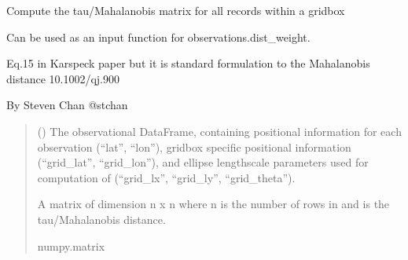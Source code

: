 \documentclass[letterpaper,10pt,english]{sphinxmanual}
\begin{document}
\begin{fulllineitems}
\label{\detokenize{misc:glomar_gridding.distances.tau_dist_from_frame}}
\pysigstartsignatures
\pysiglinewithargsret
{}
{}
{}
\pysigstopsignatures
\sphinxAtStartPar
Compute the tau/Mahalanobis matrix for all records within a gridbox

\sphinxAtStartPar
Can be used as an input function for observations.dist\_weight.

\sphinxAtStartPar
Eq.15 in Karspeck paper
but it is standard formulation to the
Mahalanobis distance
10.1002/qj.900

\sphinxAtStartPar
By Steven Chan \sphinxhyphen{} @stchan
\begin{quote}\begin{description}
\sphinxAtStartPar
{} () \textendash{} The observational DataFrame, containing positional information for each
observation (“lat”, “lon”), gridbox specific positional information
(“grid\_lat”, “grid\_lon”), and ellipse length\sphinxhyphen{}scale parameters used for
computation of  (“grid\_lx”, “grid\_ly”, “grid\_theta”).

\sphinxAtStartPar
{} \textendash{} A matrix of dimension n x n where n is the number of rows in  and
is the tau/Mahalanobis distance.

\sphinxAtStartPar
numpy.matrix

\end{description}\end{quote}

\end{fulllineitems}
\end{document}
